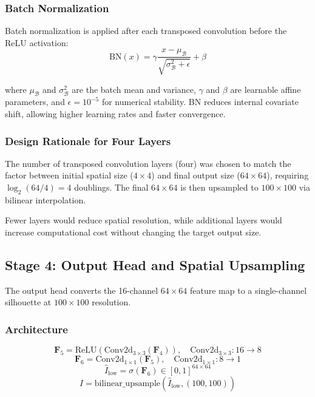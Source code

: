 \documentclass[12pt,a4paper,oneside]{report}
\begin{document}
\subsubsection{Batch Normalization}

Batch normalization is applied after each transposed convolution before the ReLU activation:
\begin{equation}
\text{BN}(x) = \gamma \frac{x - \mu_{\mathcal{B}}}{\sqrt{\sigma_{\mathcal{B}}^2 + \epsilon}} + \beta
\end{equation}

where $\mu_{\mathcal{B}}$ and $\sigma_{\mathcal{B}}^2$ are the batch mean and variance, $\gamma$ and $\beta$ are learnable affine parameters, and $\epsilon = 10^{-5}$ for numerical stability. BN reduces internal covariate shift, allowing higher learning rates and faster convergence.

\subsubsection{Design Rationale for Four Layers}

The number of transposed convolution layers (four) was chosen to match the factor between initial spatial size ($4 \times 4$) and final output size ($64 \times 64$), requiring $\log_2(64/4) = 4$ doublings. The final $64 \times 64$ is then upsampled to $100 \times 100$ via bilinear interpolation.

Fewer layers would reduce spatial resolution, while additional layers would increase computational cost without changing the target output size.

\subsection{Stage 4: Output Head and Spatial Upsampling}

The output head converts the 16-channel $64 \times 64$ feature map to a single-channel silhouette at $100 \times 100$ resolution.

\subsubsection{Architecture}

\begin{equation}
\mathbf{F}_5 = \text{ReLU}(\text{Conv2d}_{3\times3}(\mathbf{F}_4)), \quad \text{Conv2d}_{3\times3}: 16 \rightarrow 8
\end{equation}
\begin{equation}
\mathbf{F}_6 = \text{Conv2d}_{1\times1}(\mathbf{F}_5), \quad \text{Conv2d}_{1\times1}: 8 \rightarrow 1
\end{equation}
\begin{equation}
\hat{I}_{\text{low}} = \sigma(\mathbf{F}_6) \in [0, 1]^{64 \times 64}
\end{equation}
\begin{equation}
\hat{I} = \text{bilinear\_upsample}(\hat{I}_{\text{low}}, (100, 100))
\end{equation}
\end{document}
